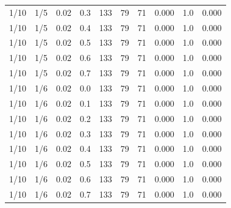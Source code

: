 \documentclass[specialist, substylefile = spbu.rtx,
			   subf, href, 12pt]{disser}
\begin{document}
\begin{table}[!hhh]
\begin{tabular}{cccccccccc}
		1/10 &   1/5 &     0.02 &     0.3 & 133 & 79 & 71 & 0.000 & 1.0 & 0.000 \\
		1/10 &   1/5 &     0.02 &     0.4 & 133 & 79 & 71 & 0.000 & 1.0 & 0.000 \\
		1/10 &   1/5 &     0.02 &     0.5 & 133 & 79 & 71 & 0.000 & 1.0 & 0.000 \\
		1/10 &   1/5 &     0.02 &     0.6 & 133 & 79 & 71 & 0.000 & 1.0 & 0.000 \\
		1/10 &   1/5 &     0.02 &     0.7 & 133 & 79 & 71 & 0.000 & 1.0 & 0.000 \\
		\hline
		1/10 &   1/6 &     0.02 &     0.0 & 133 & 79 & 71 & 0.000 & 1.0 & 0.000 \\
		1/10 &   1/6 &     0.02 &     0.1 & 133 & 79 & 71 & 0.000 & 1.0 & 0.000 \\
		1/10 &   1/6 &     0.02 &     0.2 & 133 & 79 & 71 & 0.000 & 1.0 & 0.000 \\
		1/10 &   1/6 &     0.02 &     0.3 & 133 & 79 & 71 & 0.000 & 1.0 & 0.000 \\
		1/10 &   1/6 &     0.02 &     0.4 & 133 & 79 & 71 & 0.000 & 1.0 & 0.000 \\
		1/10 &   1/6 &     0.02 &     0.5 & 133 & 79 & 71 & 0.000 & 1.0 & 0.000 \\
		1/10 &   1/6 &     0.02 &     0.6 & 133 & 79 & 71 & 0.000 & 1.0 & 0.000 \\
		1/10 &   1/6 &     0.02 &     0.7 & 133 & 79 & 71 & 0.000 & 1.0 & 0.000 \\
		\bottomrule
	\end{tabular}
	\label{tab:simplified_system_results_k=45_1}
\end{table}
\end{document}
